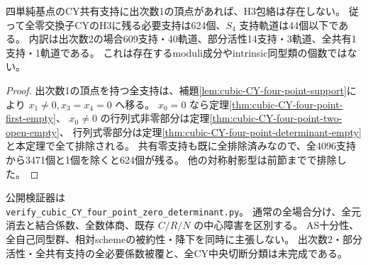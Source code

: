 \begin{corollary}\label{cor:cubic-CY-four-point-degree-one-empty}
四単純基点のCY共有支持に出次数1の頂点があれば、H3包絡は存在しない。
従って全零交換子CYのH3に残る必要支持は624個、$S_4$ 支持軌道は44個以下である。
内訳は出次数2の場合609支持・40軌道、部分活性14支持・3軌道、全共有1支持・1軌道である。
これは存在するmoduli成分やintrinsic同型類の個数ではない。
\end{corollary}
\begin{proof}
出次数1の頂点を持つ全支持は、補題\ref{lem:cubic-CY-four-point-support}により
$x_1\ne0,x_3=x_4=0$ へ移る。
$x_0=0$ なら定理\ref{thm:cubic-CY-four-point-first-empty}、
$x_0\ne0$ の行列式非零部分は定理\ref{thm:cubic-CY-four-point-two-open-empty}、
行列式零部分は定理\ref{thm:cubic-CY-four-point-determinant-empty}と本定理で全て排除される。
共有零支持も既に全排除済みなので、全4096支持から3471個と1個を除くと624個が残る。
他の対称射影型は前節までで排除した。
\end{proof}

公開検証器は\\
\texttt{verify\_cubic\_CY\_four\_point\_zero\_determinant.py}。
通常の全場合分け、全元消去と結合係数、全数体商、既存 $C/R/N$ の中心障害を区別する。
AS十分性、全自己同型群、相対schemeの被約性・降下を同時に主張しない。
出次数2・部分活性・全共有支持の全必要係数被覆と、全CY中央切断分類は未完成である。

